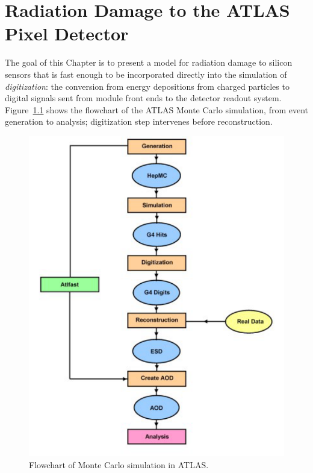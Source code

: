 \chapter{Radiation Damage to the ATLAS Pixel Detector}
\label{chap:digi}

The goal of this Chapter is to present a model for radiation damage to silicon sensors that is fast enough to be incorporated directly into the simulation of \textit{digitization}: the conversion from energy depositions from charged particles to digital signals sent from module front ends to the detector readout system.  Figure~\ref{fig:atlassim} shows the flowchart of the ATLAS Monte Carlo simulation, from 
event generation to analysis; digitization step intervenes before reconstruction.


\begin{figure}[!htpb]
\centering
\includegraphics[height=0.45\textheight]{atlassim.pdf}
\caption{\label{fig:atlassim}Flowchart of Monte Carlo simulation in ATLAS.}
\end{figure}

